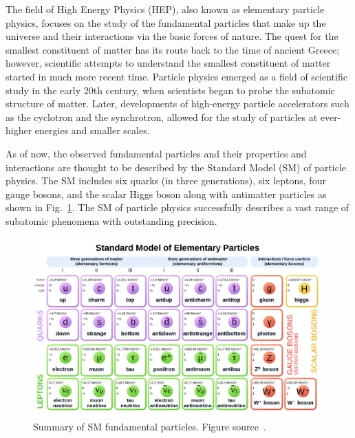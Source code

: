 
%
%
The field of High Energy Physics (HEP), also known as elementary particle physics,
focuses on the study of the fundamental particles that make up the universe and their interactions via the basic forces of nature.
%
The quest for the smallest constituent of matter has its route back to the time of ancient Greece;
however, scientific attempts to understand the smallest constituent of matter started in much more recent time.
%
Particle physics emerged as a field of scientific study in the early 20th century,
when scientists began to probe the subatomic structure of matter.
%
Later, developments
of high-energy particle accelerators such as the cyclotron and the synchrotron, allowed
for the study of particles at ever-higher energies and smaller scales.
%


%
%
As of now, the observed fundamental particles and their properties and interactions are thought to be described by the Standard Model (SM) of particle physics.
The SM includes six quarks (in three generations), six leptons, four gauge bosons, and the scalar Higgs boson along with antimatter particles as shown in Fig.~\ref{fig:SMParticles}.
The SM of particle physics successfully describes a vast range of subatomic phenomena with outstanding precision.

\begin{figure}[t!]
\centering
\includegraphics[width=0.99\textwidth]{figures/SMtable.png}
\caption[Summary of standard model fundamental particles]{Summary of SM fundamental particles. Figure source~\cite{SMtable}.
\label{fig:SMParticles}}
\end{figure}


